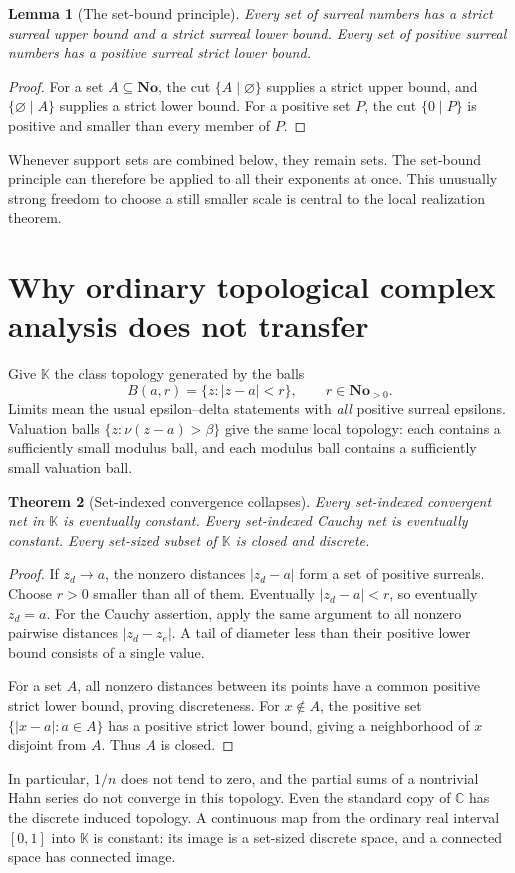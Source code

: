 \documentclass[11pt,oneside]{article}
\newtheorem{theorem}{Theorem}[section]
\newtheorem{lemma}[theorem]{Lemma}
\theoremstyle{definition}\newtheorem{definition}[theorem]{Definition}
\newcommand{\No}{\mathbf{No}}
\newcommand{\K}{\mathbb K}
\newcommand{\C}{\mathbb C}
\newcommand{\val}{\nu}
\begin{document}
\begin{lemma}[The set-bound principle]\label{lem:setbound}
Every set of surreal numbers has a strict surreal upper bound and a strict surreal lower bound. Every set of positive surreal numbers has a positive surreal strict lower bound.
\end{lemma}
\begin{proof}
For a set $A\subseteq\No$, the cut $\{A\mid\varnothing\}$ supplies a strict upper bound, and $\{\varnothing\mid A\}$ supplies a strict lower bound. For a positive set $P$, the cut $\{0\mid P\}$ is positive and smaller than every member of $P$.
\end{proof}
Whenever support sets are combined below, they remain sets. The set-bound principle can therefore be applied to all their exponents at once. This unusually strong freedom to choose a still smaller scale is central to the local realization theorem.

\section{Why ordinary topological complex analysis does not transfer}\label{sec:topology}
Give $\K$ the class topology generated by the balls
\[
 B(a,r)=\{z:|z-a|<r\},\qquad r\in\No_{>0}.
\]
Limits mean the usual epsilon--delta statements with \emph{all} positive surreal epsilons. Valuation balls $\{z:\val(z-a)>\beta\}$ give the same local topology: each contains a sufficiently small modulus ball, and each modulus ball contains a sufficiently small valuation ball.

\begin{theorem}[Set-indexed convergence collapses]\label{thm:topology}
Every set-indexed convergent net in $\K$ is eventually constant. Every set-indexed Cauchy net is eventually constant. Every set-sized subset of $\K$ is closed and discrete.
\end{theorem}
\begin{proof}
If $z_d\to a$, the nonzero distances $|z_d-a|$ form a set of positive surreals. Choose $r>0$ smaller than all of them. Eventually $|z_d-a|<r$, so eventually $z_d=a$.
For the Cauchy assertion, apply the same argument to all nonzero pairwise distances $|z_d-z_e|$. A tail of diameter less than their positive lower bound consists of a single value.

For a set $A$, all nonzero distances between its points have a common positive strict lower bound, proving discreteness. For $x\notin A$, the positive set $\{|x-a|:a\in A\}$ has a positive strict lower bound, giving a neighborhood of $x$ disjoint from $A$. Thus $A$ is closed.
\end{proof}
In particular, $1/n$ does not tend to zero, and the partial sums of a nontrivial Hahn series do not converge in this topology. Even the standard copy of $\C$ has the discrete induced topology. A continuous map from the ordinary real interval $[0,1]$ into $\K$ is constant: its image is a set-sized discrete space, and a connected space has connected image.
\end{document}

